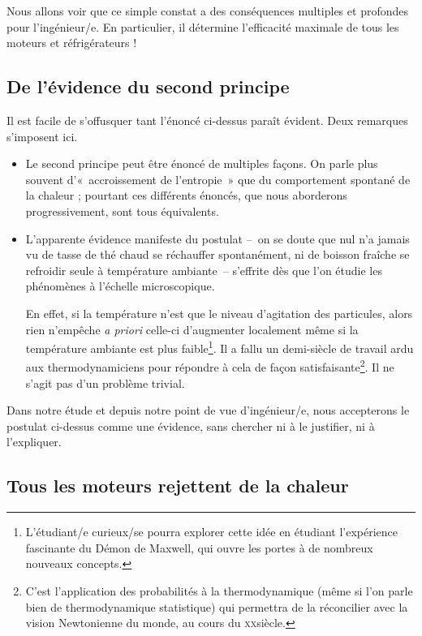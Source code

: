 		Nous allons voir que ce simple constat a des conséquences multiples et profondes pour l’ingénieur/e. En particulier, il détermine l’efficacité maximale de tous les moteurs et réfrigérateurs !



	\subsection{De l’évidence du second principe}

		Il est facile de s’offusquer tant l’énoncé ci-dessus paraît évident. Deux remarques s’imposent ici.

		\begin{itemize}
			\item Le second principe peut être énoncé de multiples façons. On parle plus souvent d’«~accroissement de l’entropie~» que du comportement spontané de la chaleur ; pourtant ces différents énoncés, que nous aborderons progressivement, sont tous équivalents.
			\item L’apparente évidence manifeste du postulat --\ on se doute que nul n’a jamais vu de tasse de thé chaud se réchauffer spontanément, ni de boisson fraîche se refroidir seule à température ambiante\ -- s’effrite dès que l’on étudie les phénomènes à l’échelle microscopique. 

		En effet, si la température n’est que le niveau d’agitation des particules, alors rien n’empêche \textit{a priori} celle-ci d’augmenter localement même si la température ambiante est plus faible\footnote{L’étudiant/e curieux/se pourra explorer cette idée en étudiant l’expérience fascinante du Démon de Maxwell, qui ouvre les portes à de nombreux nouveaux concepts.}. Il a fallu un demi-siècle de travail ardu aux thermodynamiciens pour répondre à cela de façon satisfaisante\footnote{C’est l’application des probabilités à la thermodynamique (même si l’on parle bien de thermodynamique statistique) qui permettra de la réconcilier avec la vision Newtonienne du monde, au cours du \textsc{xx}\ieme siècle.}. Il ne s’agit pas d’un problème trivial.
		\end{itemize}

		Dans notre étude et depuis notre point de vue d’ingénieur/e, nous accepterons le postulat ci-dessus comme une évidence, sans chercher ni à le justifier, ni à l’expliquer.

		 
	\subsection{Tous les moteurs rejettent de la chaleur}
	\label{ch_démo_second_principe}


